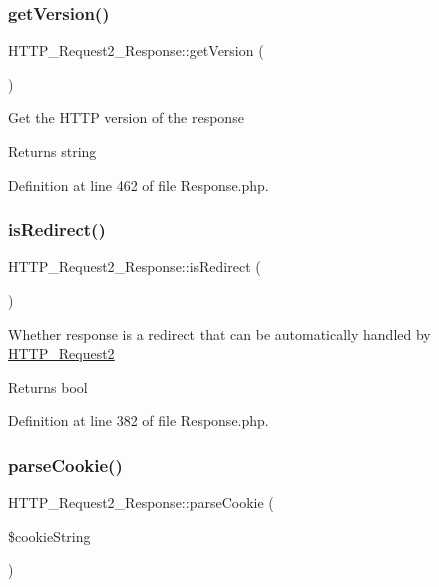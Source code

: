 \subsubsection{\texorpdfstring{get\+Version()}{getVersion()}}
{\footnotesize\ttfamily H\+T\+T\+P\+\_\+\+Request2\+\_\+\+Response\+::get\+Version (\begin{DoxyParamCaption}{ }\end{DoxyParamCaption})}

Get the H\+T\+TP version of the response

\begin{DoxyReturn}{Returns}
string 
\end{DoxyReturn}


Definition at line 462 of file Response.\+php.

\hypertarget{classHTTP__Request2__Response_a9f99e1beb096712a7b1ebda78b638b06}{}\label{classHTTP__Request2__Response_a9f99e1beb096712a7b1ebda78b638b06} 
\subsubsection{\texorpdfstring{is\+Redirect()}{isRedirect()}}
{\footnotesize\ttfamily H\+T\+T\+P\+\_\+\+Request2\+\_\+\+Response\+::is\+Redirect (\begin{DoxyParamCaption}{ }\end{DoxyParamCaption})}

Whether response is a redirect that can be automatically handled by \hyperlink{classHTTP__Request2}{H\+T\+T\+P\+\_\+\+Request2}

\begin{DoxyReturn}{Returns}
bool 
\end{DoxyReturn}


Definition at line 382 of file Response.\+php.

\hypertarget{classHTTP__Request2__Response_a98d67c4a923e69edcfbca9233dd71a81}{}\label{classHTTP__Request2__Response_a98d67c4a923e69edcfbca9233dd71a81} 
\subsubsection{\texorpdfstring{parse\+Cookie()}{parseCookie()}}
{\footnotesize\ttfamily H\+T\+T\+P\+\_\+\+Request2\+\_\+\+Response\+::parse\+Cookie (\begin{DoxyParamCaption}\item[{}]{\$cookie\+String }\end{DoxyParamCaption})\hspace{0.3cm}{\ttfamily [protected]}}


